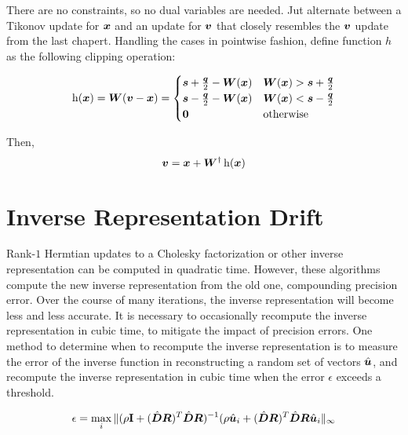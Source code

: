 There are no constraints, so no dual variables are needed. Jut alternate between a Tikonov update for $\bm{x}$ and an update for $\bm{v}$ that closely resembles the $\bm{v}$ update from the last chapert.
Handling the cases in pointwise fashion, define function $h$ as the following clipping operation:

\begin{equation}
\operatorname{h}(\bm{x}) = \bm{W}(\bm{v} - \bm{x}) = \begin{cases} \bm{s} + \frac{\bm{q}}{2} - \bm{W}(\bm{x}) & \bm{W}(\bm{x}) > \bm{s} + \frac{\bm{q}}{2} \\ \bm{s} - \frac{\bm{q}}{2} - \bm{W}(\bm{x}) & \bm{W}(\bm{x}) < \bm{s} - \frac{\bm{q}}{2} \\ \bm{0} & \text{otherwise}
\end{cases}
\end{equation}

Then,
\begin{equation}
\bm{v} = \bm{x} + \bm{W}^{\dagger}\operatorname{h}(\bm{x})
\end{equation}

\section{Inverse Representation Drift}
Rank-$1$ Hermtian updates to a Cholesky factorization or other inverse representation can be computed in quadratic time. However, these algorithms compute the new inverse representation from the old one, compounding precision error. Over the course of many iterations, the inverse representation will become less and less accurate. It is necessary to occasionally recompute the inverse representation in cubic time, to mitigate the impact of precision errors.  One method to determine when to recompute the inverse representation is to measure the error of the inverse function in reconstructing a random set of vectors $\hat{\bm{u}}$, and recompute the inverse representation in cubic time when the error $\epsilon$ exceeds a threshold.

\begin{equation}
\epsilon = \max_i \|(\rho{\bf I} + (\hat{\bm{D}}\bm{R})^T\hat{\bm{D}}\bm{R})^{-1}(\rho\hat{\bm{u}}_i + (\hat{\bm{D}}\bm{R})^T\hat{\bm{D}}\bm{R}\hat{\bm{u}}_i\|_{\infty}
\end{equation} 

